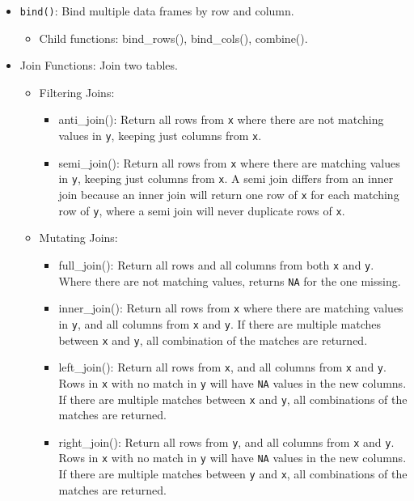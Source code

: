 \documentclass[
]{book}
\providecommand{\tightlist}{%
  \setlength{\itemsep}{0pt}\setlength{\parskip}{0pt}}
\begin{document}
\begin{itemize}
\tightlist
\item
  \texttt{bind()}: Bind multiple data frames by row and column.

  \begin{itemize}
  \tightlist
  \item
    Child functions: bind\_rows(), bind\_cols(), combine().
  \end{itemize}
\item
  Join Functions: Join two tables.

  \begin{itemize}
  \tightlist
  \item
    Filtering Joins:

    \begin{itemize}
    \tightlist
    \item
      anti\_join(): Return all rows from \texttt{x} where there are not matching values in \texttt{y}, keeping just columns from \texttt{x}.
    \item
      semi\_join(): Return all rows from \texttt{x} where there are matching values in \texttt{y}, keeping just columns from \texttt{x}. A semi join differs from an inner join because an inner join will return one row of \texttt{x} for each matching row of \texttt{y}, where a semi join will never duplicate rows of \texttt{x}.
    \end{itemize}
  \item
    Mutating Joins:

    \begin{itemize}
    \tightlist
    \item
      full\_join(): Return all rows and all columns from both \texttt{x} and \texttt{y}. Where there are not matching values, returns \texttt{NA} for the one missing.
    \item
      inner\_join(): Return all rows from \texttt{x} where there are matching values in \texttt{y}, and all columns from \texttt{x} and \texttt{y}. If there are multiple matches between \texttt{x} and \texttt{y}, all combination of the matches are returned.
    \item
      left\_join(): Return all rows from \texttt{x}, and all columns from \texttt{x} and \texttt{y}. Rows in \texttt{x} with no match in \texttt{y} will have \texttt{NA} values in the new columns. If there are multiple matches between \texttt{x} and \texttt{y}, all combinations of the matches are returned.
    \item
      right\_join(): Return all rows from \texttt{y}, and all columns from \texttt{x} and \texttt{y}. Rows in \texttt{x} with no match in \texttt{y} will have \texttt{NA} values in the new columns. If there are multiple matches between \texttt{y} and \texttt{x}, all combinations of the matches are returned.
    \end{itemize}
  \end{itemize}
\end{itemize}
\end{document}
